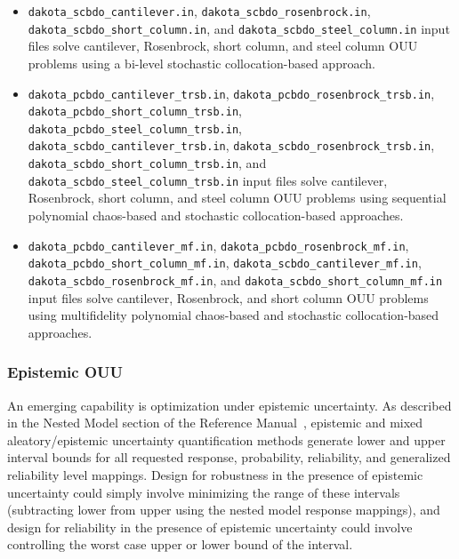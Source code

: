 \begin{itemize}
\item \texttt{dakota\_scbdo\_cantilever.in}, 
\texttt{dakota\_scbdo\_rosenbrock.in}, \\
\texttt{dakota\_scbdo\_short\_column.in}, and
\texttt{dakota\_scbdo\_steel\_column.in} input files solve 
cantilever, Rosenbrock, short column, and steel column OUU problems
using a bi-level stochastic collocation-based approach.

\item \texttt{dakota\_pcbdo\_cantilever\_trsb.in},
\texttt{dakota\_pcbdo\_rosenbrock\_trsb.in}, \\
\texttt{dakota\_pcbdo\_short\_column\_trsb.in}, 
\texttt{dakota\_pcbdo\_steel\_column\_trsb.in},\\
\texttt{dakota\_scbdo\_cantilever\_trsb.in}, 
\texttt{dakota\_scbdo\_rosenbrock\_trsb.in}, \\
\texttt{dakota\_scbdo\_short\_column\_trsb.in}, and
\texttt{dakota\_scbdo\_steel\_column\_trsb.in} input files solve 
cantilever, Rosenbrock, short column, and steel column OUU problems
using sequential polynomial chaos-based and stochastic
collocation-based approaches.

\item \texttt{dakota\_pcbdo\_cantilever\_mf.in},
\texttt{dakota\_pcbdo\_rosenbrock\_mf.in}, \\
\texttt{dakota\_pcbdo\_short\_column\_mf.in}, 
\texttt{dakota\_scbdo\_cantilever\_mf.in}, \\
\texttt{dakota\_scbdo\_rosenbrock\_mf.in}, and
\texttt{dakota\_scbdo\_short\_column\_mf.in} input files solve 
cantilever, Rosenbrock, and short column OUU problems
using multifidelity polynomial chaos-based and stochastic
collocation-based approaches.
\end{itemize}


\subsubsection{Epistemic OUU} \label{models:ex:ouu:epistemic}

An emerging capability is optimization under epistemic uncertainty.
As described in the Nested Model section of the Reference
Manual~\cite{RefMan}, epistemic and mixed aleatory/epistemic
uncertainty quantification methods generate lower and upper interval
bounds for all requested response, probability, reliability, and
generalized reliability level mappings.  Design for robustness in the
presence of epistemic uncertainty could simply involve minimizing the
range of these intervals (subtracting lower from upper using the
nested model response mappings), and design for reliability in the
presence of epistemic uncertainty could involve controlling the worst
case upper or lower bound of the interval.

